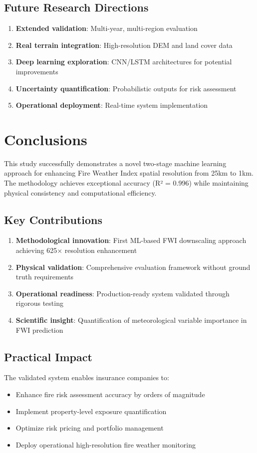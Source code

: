 \documentclass[11pt,a4paper]{article}
\begin{document}
\subsection{Future Research Directions}
\begin{enumerate}
    \item \textbf{Extended validation}: Multi-year, multi-region evaluation
    \item \textbf{Real terrain integration}: High-resolution DEM and land cover data
    \item \textbf{Deep learning exploration}: CNN/LSTM architectures for potential improvements
    \item \textbf{Uncertainty quantification}: Probabilistic outputs for risk assessment
    \item \textbf{Operational deployment}: Real-time system implementation
\end{enumerate}

\section{Conclusions}

This study successfully demonstrates a novel two-stage machine learning approach for enhancing Fire Weather Index spatial resolution from 25km to 1km. The methodology achieves exceptional accuracy (R² = 0.996) while maintaining physical consistency and computational efficiency.

\subsection{Key Contributions}
\begin{enumerate}
    \item \textbf{Methodological innovation}: First ML-based FWI downscaling approach achieving 625× resolution enhancement
    \item \textbf{Physical validation}: Comprehensive evaluation framework without ground truth requirements
    \item \textbf{Operational readiness}: Production-ready system validated through rigorous testing
    \item \textbf{Scientific insight}: Quantification of meteorological variable importance in FWI prediction
\end{enumerate}

\subsection{Practical Impact}
The validated system enables insurance companies to:
\begin{itemize}
    \item Enhance fire risk assessment accuracy by orders of magnitude
    \item Implement property-level exposure quantification
    \item Optimize risk pricing and portfolio management
    \item Deploy operational high-resolution fire weather monitoring
\end{itemize}
\end{document}
